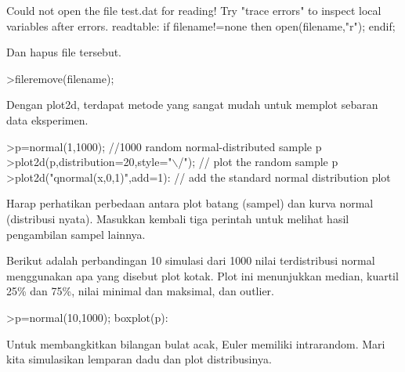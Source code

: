 \documentclass[a4paper,10pt]{article}
\begin{document}
\begin{eulernotebook}
\begin{eulercomment}
\begin{eulercomment}
\begin{eulercomment}
\begin{eulercomment}
\begin{eulercomment}
\begin{eulercomment}
\begin{eulercomment}
\begin{eulercomment}
\begin{eulercomment}
\begin{eulercomment}
\begin{eulercomment}
\begin{eulercomment}
\begin{eulercomment}
\begin{eulercomment}
\begin{eulercomment}
\begin{eulercomment}
\begin{eulercomment}
\begin{eulercomment}
\begin{eulerprompt}
\end{eulerprompt}
\begin{euleroutput}
  Could not open the file
  test.dat
  for reading!
  Try "trace errors" to inspect local variables after errors.
  readtable:
      if filename!=none then open(filename,"r"); endif;
\end{euleroutput}
\begin{eulercomment}
Dan hapus file tersebut.
\end{eulercomment}
\begin{eulerprompt}
>fileremove(filename);
\end{eulerprompt}
\begin{eulercomment}
Dengan plot2d, terdapat metode yang sangat mudah untuk memplot sebaran
data eksperimen.
\end{eulercomment}
\begin{eulerprompt}
>p=normal(1,1000); //1000 random normal-distributed sample p
>plot2d(p,distribution=20,style="\(\backslash\)/"); // plot the random sample p
>plot2d("qnormal(x,0,1)",add=1): // add the standard normal distribution plot
\end{eulerprompt}
\begin{eulercomment}
Harap perhatikan perbedaan antara plot batang (sampel) dan kurva
normal (distribusi nyata). Masukkan kembali tiga perintah untuk
melihat hasil pengambilan sampel lainnya.
\end{eulercomment}
\begin{eulercomment}
Berikut adalah perbandingan 10 simulasi dari 1000 nilai terdistribusi
normal menggunakan apa yang disebut plot kotak. Plot ini menunjukkan
median, kuartil 25\% dan 75\%, nilai minimal dan maksimal, dan outlier.
\end{eulercomment}
\begin{eulerprompt}
>p=normal(10,1000); boxplot(p):
\end{eulerprompt}
\begin{eulercomment}
Untuk membangkitkan bilangan bulat acak, Euler memiliki intrarandom.
Mari kita simulasikan lemparan dadu dan plot distribusinya.


\end{eulercomment}
\end{eulercomment}
\end{eulercomment}
\end{eulercomment}
\end{eulercomment}
\end{eulercomment}
\end{eulercomment}
\end{eulercomment}
\end{eulercomment}
\end{eulercomment}
\end{eulercomment}
\end{eulercomment}
\end{eulercomment}
\end{eulercomment}
\end{eulercomment}
\end{eulercomment}
\end{eulercomment}
\end{eulercomment}
\end{eulercomment}
\end{eulernotebook}
\end{document}
